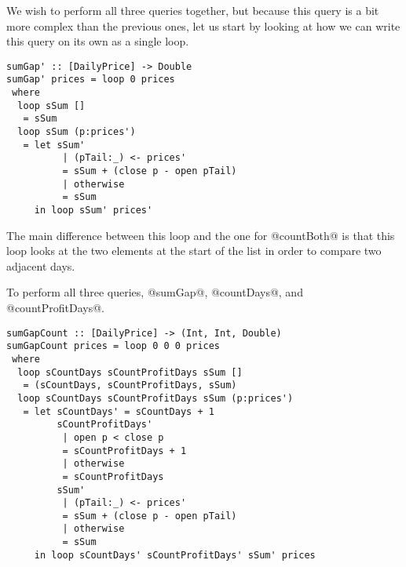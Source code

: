 We wish to perform all three queries together, but because this query is a bit more complex than the previous ones, let us start by looking at how we can write this query on its own as a single loop.

\begin{lstlisting}
sumGap' :: [DailyPrice] -> Double
sumGap' prices = loop 0 prices
 where
  loop sSum []
   = sSum
  loop sSum (p:prices')
   = let sSum'
          | (pTail:_) <- prices'
          = sSum + (close p - open pTail)
          | otherwise
          = sSum
     in loop sSum' prices'
\end{lstlisting}


The main difference between this loop and the one for @countBoth@ is that this loop looks at the two elements at the start of the list in order to compare two adjacent days.

To perform all three queries, @sumGap@, @countDays@, and @countProfitDays@.

\begin{lstlisting}
sumGapCount :: [DailyPrice] -> (Int, Int, Double)
sumGapCount prices = loop 0 0 0 prices
 where
  loop sCountDays sCountProfitDays sSum []
   = (sCountDays, sCountProfitDays, sSum)
  loop sCountDays sCountProfitDays sSum (p:prices')
   = let sCountDays' = sCountDays + 1
         sCountProfitDays'
          | open p < close p
          = sCountProfitDays + 1
          | otherwise
          = sCountProfitDays
         sSum'
          | (pTail:_) <- prices'
          = sSum + (close p - open pTail)
          | otherwise
          = sSum
     in loop sCountDays' sCountProfitDays' sSum' prices
\end{lstlisting}



% 


